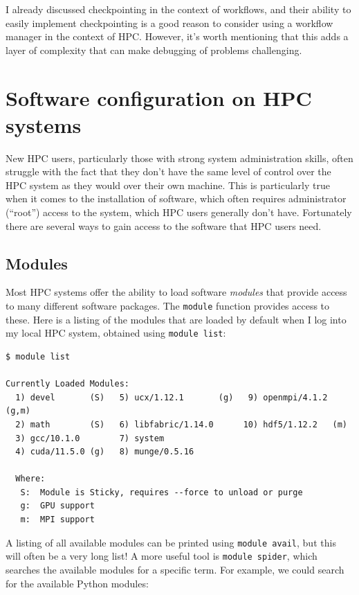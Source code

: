 I already discussed checkpointing in the context of workflows, and their ability to easily implement checkpointing is a good reason to consider using a workflow manager in the context of HPC. However, it's worth mentioning that this adds a layer of complexity that can make debugging of problems challenging.

\section{Software configuration on HPC systems}

New HPC users, particularly those with strong system administration skills, often struggle with the fact that they don't have the same level of control over the HPC system as they would over their own machine.  This is particularly true when it comes to the installation of software, which often requires administrator (``root'') access to the system, which HPC users generally don't have.  Fortunately there are several ways to gain access to the software that HPC users need.

\subsection{Modules}

Most HPC systems offer the ability to load software \textit{modules} that provide access to many different software packages.  The \texttt{module} function provides access to these.  Here is a listing of the modules that are loaded by default when I log into my local HPC system, obtained using \texttt{module list}:

\begin{lstlisting}[style=shell]
$ module list

Currently Loaded Modules:
  1) devel       (S)   5) ucx/1.12.1       (g)   9) openmpi/4.1.2 (g,m)
  2) math        (S)   6) libfabric/1.14.0      10) hdf5/1.12.2   (m)
  3) gcc/10.1.0        7) system
  4) cuda/11.5.0 (g)   8) munge/0.5.16

  Where:
   S:  Module is Sticky, requires --force to unload or purge
   g:  GPU support
   m:  MPI support
\end{lstlisting}

A listing of all available modules can be printed using \texttt{module avail}, but this will often be a very long list!  A more useful tool is \texttt{module spider}, which searches the available modules for a specific term. For example, we could search for the available Python modules:

